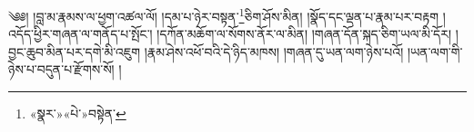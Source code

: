 ༄༅། །བླ་མ་རྣམས་ལ་ཕྱག་འཚལ་ལོ། །དམ་པ་ཉེར་བསྟན་\footnote{«སྣར་»«པེ་»བསྟེན་}ཅིག་ཤོས་མིན། །སྣོད་དང་ལྡན་པ་རྣམ་པར་བརྟག །འདོད་ཕྱིར་གཞན་ལ་གནོད་པ་སྤོང་། །དཀོན་མཆོག་ལ་སོགས་ནོར་ལ་མིན། །གཞན་དོན་སྐད་ཅིག་ཡལ་མི་དོར། །བྱང་ཆུབ་མིན་པར་དགེ་མི་འཇུག །རྣམ་ཤེས་འཕོ་བའི་དེ་ཉིད་མཁས། །གཞན་དུ་ཡན་ལག་ཉེས་པའོ། །ཡན་ལག་གི་ཉེས་པ་བདུན་པ་རྫོགས་སོ། ། 